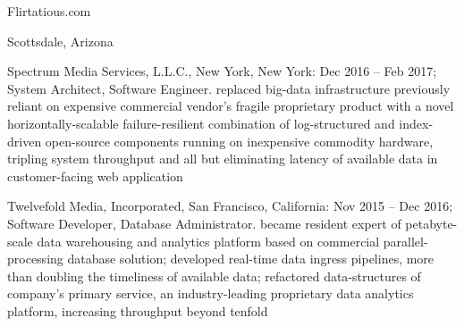 {{{{{{{							\par%
							\smallskip%
							{%
								\mybigit%
								Flirtatious.com%
								\hfil%
								\par%
							}%
							\quad%
							Scottsdale, Arizona%
							\hfil%
							\par%
						}%
					}%
				}%
			}%
		}%
		\par%
		\bigskip%
		\myrm%
		{%
			\myit%
			Spectrum Media Services, L.L.C., %
		}%
		New York, New York: Dec 2016 -- Feb 2017; System Architect, Software Engineer. replaced big-data infrastructure previously reliant on expensive commercial vendor's fragile proprietary product with a novel horizontally-scalable failure-resilient combination of log-structured and index-driven open-source components running on inexpensive commodity hardware, tripling system throughput and all but eliminating latency of available data in customer-facing web application%
		\hfil%
		\par%
		\medskip%
		\myrm%
		{%
			\myit%
			Twelvefold Media, Incorporated, %
		}%
		San Francisco, California: Nov 2015 -- Dec 2016; Software Developer, Database Administrator. became resident expert of petabyte-scale data warehousing and analytics platform based on commercial parallel-processing database solution; developed real-time data ingress pipelines, more than doubling the timeliness of available data; refactored data-structures of company's primary service, an industry-leading proprietary data analytics platform, increasing throughput beyond tenfold%
}}
